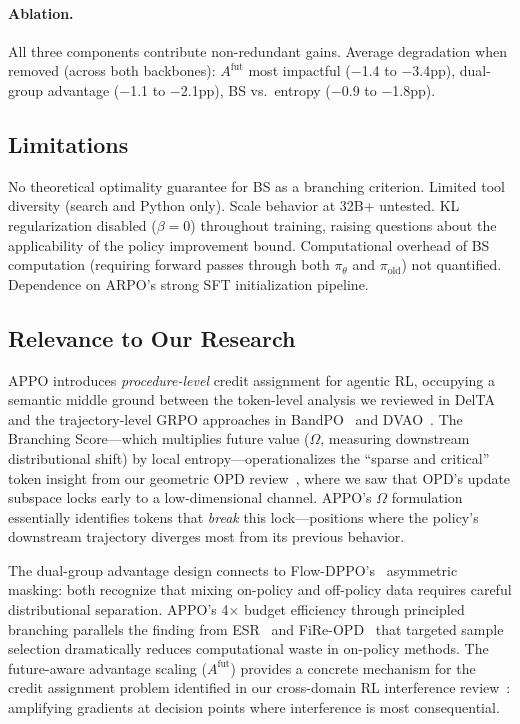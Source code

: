 \documentclass[11pt,a4paper]{article}
\begin{document}
\paragraph{Ablation.} All three components contribute non-redundant gains. Average degradation when removed (across both backbones): $A^{\mathrm{fut}}$ most impactful ($-$1.4 to $-$3.4pp), dual-group advantage ($-$1.1 to $-$2.1pp), BS vs.\ entropy ($-$0.9 to $-$1.8pp).

\subsection{Limitations}

No theoretical optimality guarantee for BS as a branching criterion. Limited tool diversity (search and Python only). Scale behavior at 32B+ untested. KL regularization disabled ($\beta\!=\!0$) throughout training, raising questions about the applicability of the policy improvement bound. Computational overhead of BS computation (requiring forward passes through both $\pi_\theta$ and $\pi_{\mathrm{old}}$) not quantified. Dependence on ARPO's strong SFT initialization pipeline.

\subsection{Relevance to Our Research}

APPO introduces \emph{procedure-level} credit assignment for agentic RL, occupying a semantic middle ground between the token-level analysis we reviewed in DelTA~\cite{wang2026delta} and the trajectory-level GRPO approaches in BandPO~\cite{li2026bandpo} and DVAO~\cite{chen2026dvao}. The Branching Score---which multiplies future value ($\Omega$, measuring downstream distributional shift) by local entropy---operationalizes the ``sparse and critical'' token insight from our geometric OPD review~\cite{shen2026geometry}, where we saw that OPD's update subspace locks early to a low-dimensional channel. APPO's $\Omega$ formulation essentially identifies tokens that \emph{break} this lock---positions where the policy's downstream trajectory diverges most from its previous behavior.

The dual-group advantage design connects to Flow-DPPO's~\cite{ping2026flowdppo} asymmetric masking: both recognize that mixing on-policy and off-policy data requires careful distributional separation. APPO's 4$\times$ budget efficiency through principled branching parallels the finding from ESR~\cite{wang2026esr} and FiRe-OPD~\cite{li2026fireopd} that targeted sample selection dramatically reduces computational waste in on-policy methods. The future-aware advantage scaling ($A^{\mathrm{fut}}$) provides a concrete mechanism for the credit assignment problem identified in our cross-domain RL interference review~\cite{liu2026crossdomain}: amplifying gradients at decision points where interference is most consequential.
\end{document}
